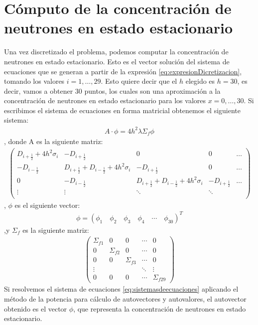 \documentclass[11pt,a4paper]{emulateapj}
\begin{document}
\section{Cómputo de la concentración de neutrones en estado estacionario}
\label{sec:computo}
Una vez discretizado el problema, podemos computar la concentración de neutrones en estado estacionario. Esto es el vector solución del sistema de ecuaciones que se generan a partir de la expresión \ref{eq:expresionDicretizacion}, tomando los valores $i = 1,\ldots,29$. Esto quiere decir que el $h$ elegido es $h=30$, es decir, vamos a obtener 30 puntos, los cuales son una aproximación a la concentración de neutrones en estado estacionario para los valores $x=0,\ldots,30$. Si escribimos el sistema de ecuaciones en forma matricial obtenemos el siguiente sistema:
\begin{eqnarray}
\label{eq:sistemasdeecuaciones}
A \cdot \phi = 4h^2 \lambda \Sigma_f \phi
\end{eqnarray}
, donde A es la siguiente matriz:
\begin{eqnarray}
\label{eqn:matrizA}
	 \left( \begin{array}{ccccc}
		D_{i+\frac{1}{2}} + 4h^2\sigma_i & -D_{i+\frac{1}{2}}  					& 0 		& 0 & \dots \\
		-D_{i-\frac{1}{2}} 		& D_{i+\frac{1}{2}} + D_{i-\frac{1}{2}} + 4h^2\sigma_i 	& -D_{i+\frac{1}{2}} & 0 & \dots \\
		0 & -D_{i-\frac{1}{2}}& D_{i+\frac{1}{2}} + D_{i-\frac{1}{2}} + 4h^2\sigma_i & -D_{i+\frac{1}{2}}  & \dots\\
		\vdots &\vdots&\ddots&\ddots&\\
		\end{array} 
	\right)
\end{eqnarray}
, $\phi$ es el siguiente vector:
\begin{eqnarray}
\phi = (\phi_1 \quad \phi_2 \quad \phi_3 \quad \phi_4 \quad \cdots\quad \phi_{30} )^T
\end{eqnarray}
,y $\Sigma_f$ es la siguiente matriz:
\begin{eqnarray}
\label{eqn:matrizA}
	 \left( \begin{array}{ccccc}
		\Sigma_{f1} & 0 & 0 & \cdots & 0\\
		0 & \Sigma_{f2} & 0 &\cdots & 0\\
		0 & 0 & \Sigma_{f3} &\cdots & 0\\
		\vdots & & & \ddots & \vdots \\
		0 & 0 & 0 & \cdots & \Sigma_{f29}
		\end{array} 
	\right)
\end{eqnarray}
Si resolvemos el sistema de ecuaciones \ref{eq:sistemasdeecuaciones} aplicando el método de la potencia para cálculo de autovectores y autovalores, el autovector obtenido es el vector $\phi$, que representa la concentración de neutrones en estado estacionario. 
\end{document}

